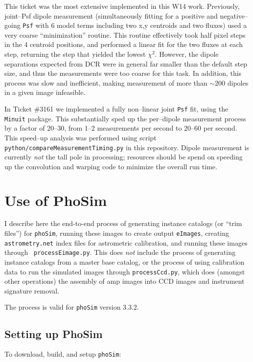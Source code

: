\documentclass[prd, nofootinbib, floatfix, 11pt, tightenlines, times]{article}
\begin{document}
\begin{appendices}
This ticket was the most extensive implemented in this W14 work.
Previously, joint--Psf dipole measurement (simultaneously fitting for
a positive and negative--going {\tt Psf} with 6 model terms including
two x,y centroids and two fluxes) used a very coarse ``minimization''
routine.  This routine effectively took half pixel steps in the 4
centroid positions, and performed a linear fit for the two fluxes at
each step, returning the step that yielded the lowest $\chi^2$.
However, the dipole separations expected from DCR were in general far
smaller than the default step size, and thus the measurements were too
coarse for this task.  In addition, this process was slow and
inefficient, making measurement of more than $\sim 200$ dipoles in a
given image infeasible.

In Ticket \#3161 we implemented a fully non--linear joint {\tt Psf}
fit, using the {\tt Minuit} package.  This substantially sped up the
per--dipole measurement process by a factor of 20--30, from 1--2
measurements per second to 20--60 per second.  This speed--up analysis
was performed using script {\tt python/compareMeasurementTiming.py} in
this repository.  Dipole measurement is currently {\it not} the tall
pole in processing; resources should be spend on speeding up the
convolution and warping code to minimize the overall run time.


\section{Use of PhoSim}

I describe here the end-to-end process of generating instance catalogs
(or ``trim files'') for {\tt phoSim}, running these images to create
output {\tt eImages}, creating {\tt astrometry.net} index files for
astrometric calibration, and running these images through {\tt
  processEimage.py}.  This does {\it not} include the process of
generating instance catalogs from a master base catalog, or the
process of using calibration data to run the simulated images through
{\tt processCcd.py}, which does (amongst other operations) the
assembly of amp images into CCD images and instrument signature
removal.  

The process is valid for {\tt phoSim} version 3.3.2.  

\subsection{Setting up PhoSim}

To download, build, and setup {\tt phoSim}:


\end{appendices}
\end{document}
